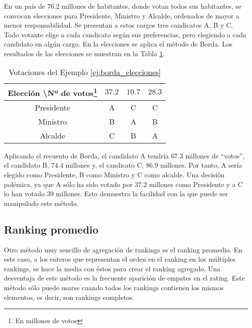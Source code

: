 \begin{ejemplo}\label{ej:borda_elecciones} 

En un país de $76.2$ millones de habitantes, donde votan todos sus habitantes, se convocan elecciones para Presidente, Ministro y Alcalde, ordenados de mayor a menor responsabilidad. Se presentan a estos cargos tres candicatos A, B y C. Todo votante elige a cada candicato según sus preferencias, pero elegiendo a cada candidato en algún cargo. En la elecciones se aplica el método de Borda. Los resultados de las elecciones se muestran en la Tabla \ref{tbl:borda_elecciones}.\\
 
\begin{savenotes}
\begin{table}[h]
\centering
\caption{Votaciones del Ejemplo \ref{ej:borda_elecciones}}
\label{tbl:borda_elecciones}
\begin{tabular}{@{}cccc@{}}
\toprule
Elección \textbackslash Nº de votos\footnote{En millones de votos} & $37.2$ & $10.7$ & $28.3$ \\ \midrule
Presidente           & A    & C    & C    \\
Ministro             & B    & A    & B    \\
Alcalde              & C    & B    & A    \\ \bottomrule
\end{tabular}
\end{table}
\end{savenotes}

Aplicando el recuento de Borda, el candidato A tendría $67.3$ millones de ``votos'', el candidato B, $74.4$ millones y, el candicato C, $86.9$ millones. Por tanto, A sería elegido como Presidente, B como Ministro y C como alcalde. Una decisión polémica, ya que A sólo ha sido votado por $37.2$ millones como Presidente y a C lo han votado $39$ millones. Esto demuestra la facilidad con la que puede ser manipulado este método.  

\end{ejemplo}

\subsection{Ranking promedio}
Otro método muy sencillo de agregación de rankings es el ranking promedio. En este caso, a los enteros que representan el orden en el ranking en los múltiples rankings, se hace la media con éstos para crear el ranking agregado. Una desventaja de este método es la frecuente aparición de empates en el rating. Este método sólo puede usarse cuando todos los rankings contienen los mismos elementos, es decir, son rankings completos. 

